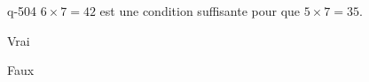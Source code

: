 \begin{truefalse}{q-504}
$6\times 7 = 42 $ est une condition suffisante pour que $5\times 7 = 35$.
\item* Vrai
\item Faux
\end{truefalse}

